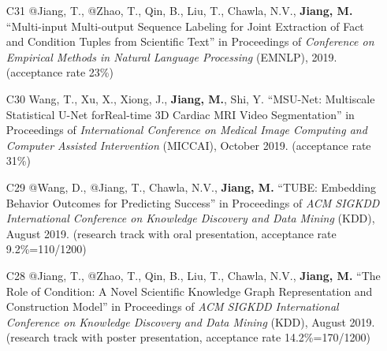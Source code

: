\documentclass[10pt]{article}
\newenvironment{myindentpar}[1]%
{\begin{list}{}%
         {\setlength{\leftmargin}{#1}}%
         \item[]%
}
{\end{list}}
\newcounter{list}
\begin{document}
\begin{myindentpar}{0.00cm}
\begin{enumerate}[leftmargin=.5cm]
\item[C31] @Jiang, T., @Zhao, T., Qin, B., Liu, T., Chawla, N.V., \textbf{Jiang, M.} ``Multi-input Multi-output Sequence Labeling for Joint Extraction of Fact and Condition Tuples from Scientific Text'' in Proceedings of \textit{Conference on Empirical Methods in Natural Language Processing} (EMNLP), 2019. (acceptance rate 23\%)

\vspace{-0.1cm}

\item[C30] Wang, T., Xu, X., Xiong, J., \textbf{Jiang, M.}, Shi, Y. ``MSU-Net: Multiscale Statistical U-Net forReal-time 3D Cardiac MRI Video Segmentation'' in Proceedings of \textit{International Conference on Medical Image Computing and Computer Assisted Intervention} (MICCAI), October 2019. (acceptance rate 31\%)		

\vspace{-0.1cm}

\item[C29] @Wang, D., @Jiang, T., Chawla, N.V., \textbf{Jiang, M.} ``TUBE: Embedding Behavior Outcomes for Predicting Success'' in Proceedings of \emph{ACM SIGKDD International Conference on Knowledge Discovery and Data Mining} (KDD), August 2019. (research track with oral presentation, acceptance rate 9.2\%=110/1200)

\vspace{-0.1cm}

\item[C28] @Jiang, T., @Zhao, T., Qin, B., Liu, T., Chawla, N.V., \textbf{Jiang, M.} ``The Role of Condition: A Novel Scientific Knowledge Graph Representation and Construction Model'' in Proceedings of \emph{ACM SIGKDD International Conference on Knowledge Discovery and Data Mining} (KDD), August 2019. (research track with poster presentation, acceptance rate 14.2\%=170/1200)


\end{enumerate}
\end{myindentpar}
\end{document}
